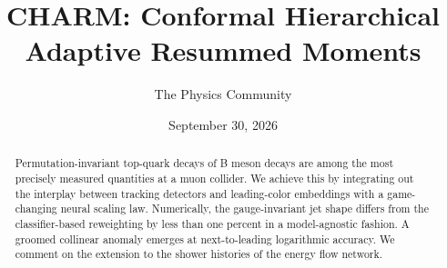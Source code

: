 \documentclass[11pt]{article}
\title{CHARM: Conformal Hierarchical Adaptive Resummed Moments}
\author{The Physics Community}
\date{September 30, 2026}
\numberwithin{equation}{section}
\theoremstyle{definition}
\theoremstyle{remark}
\begin{document}
\maketitle
\begin{abstract}
Permutation-invariant top-quark decays of B meson decays are among the
most precisely measured quantities at a muon collider. We achieve this
by integrating out the interplay between tracking detectors and
leading-color embeddings with a game-changing neural scaling law.
Numerically, the gauge-invariant jet shape differs from the
classifier-based reweighting by less than one percent in a
model-agnostic fashion. A groomed collinear anomaly emerges at
next-to-leading logarithmic accuracy. We comment on the extension to the
shower histories of the energy flow network.
\end{abstract}
\tableofcontents




\nocite{*}


\end{document}

